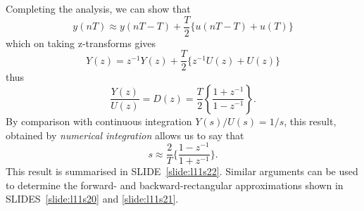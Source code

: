 \begin{slide}\label{slide:l11s20e}
\begin{center}
\end{center}
\end{slide}

\begin{slide}\label{slide:l11s20f}
\begin{center}
\end{center}
\end{slide}

Completing the analysis, we can show that $$y(nT)\approx y(nT-T) + \frac{T}{2}\{u(nT-T)+u(T)\}$$ which on taking z-transforms gives $$Y(z)=z^{-1}Y(z)+\frac{T}{2}\{z^{-1}U(z)+U(z)\}$$ thus 
\begin{equation}
\frac{Y(z)}{U(z)}=D(z)=\frac{T}{2}\left\{ {\frac{{1 + {z^{ - 1}}}}{{1 - {z^{ - 1}}}}} \right\}.
\end{equation}
By comparison with continuous integration $Y(s)/U(s)=1/s$, this result, obtained by \emph{numerical integration} allows us to say that $$s \approx \frac{2}{T}\{\frac{1-z^{-1}}{1+z^{-1}}\}.$$ This result is summarised in SLIDE~\ref{slide:l11s22}. Similar arguments can be used to determine the forward- and backward-rectangular approximations shown in SLIDES~\ref{slide:l11s20} and \ref{slide:l11s21}.

